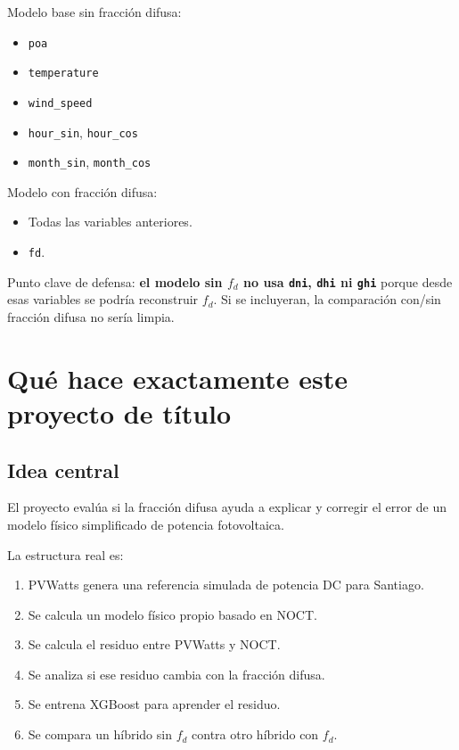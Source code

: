 \documentclass[11pt, letterpaper]{article}
\newcommand{\fd}{f_d}
\begin{document}
Modelo base sin fracci\'on difusa:

\begin{itemize}
    \item \texttt{poa}
    \item \texttt{temperature}
    \item \texttt{wind\_speed}
    \item \texttt{hour\_sin}, \texttt{hour\_cos}
    \item \texttt{month\_sin}, \texttt{month\_cos}
\end{itemize}

Modelo con fracci\'on difusa:

\begin{itemize}
    \item Todas las variables anteriores.
    \item \texttt{fd}.
\end{itemize}

Punto clave de defensa: \textbf{el modelo sin \(\fd\) no usa \texttt{dni}, \texttt{dhi} ni \texttt{ghi}} porque desde esas variables se podr\'ia reconstruir \(\fd\). Si se incluyeran, la comparaci\'on con/sin fracci\'on difusa no ser\'ia limpia.

\section{Qu\'e hace exactamente este proyecto de t\'itulo}

\subsection{Idea central}

El proyecto eval\'ua si la fracci\'on difusa ayuda a explicar y corregir el error de un modelo f\'isico simplificado de potencia fotovoltaica.

La estructura real es:

\begin{enumerate}
    \item PVWatts genera una referencia simulada de potencia DC para Santiago.
    \item Se calcula un modelo f\'isico propio basado en NOCT.
    \item Se calcula el residuo entre PVWatts y NOCT.
    \item Se analiza si ese residuo cambia con la fracci\'on difusa.
    \item Se entrena XGBoost para aprender el residuo.
    \item Se compara un h\'ibrido sin \(\fd\) contra otro h\'ibrido con \(\fd\).
\end{enumerate}
\end{document}
